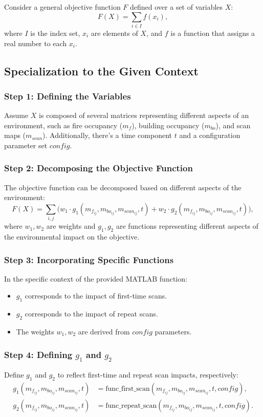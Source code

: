 \documentclass{article}
\begin{document}
Consider a general objective function $F$ defined over a set of variables $X$:
\[ F(X) = \sum_{i \in I} f(x_i), \]
where $I$ is the index set, $x_i$ are elements of $X$, and $f$ is a function that assigns a real number to each $x_i$.

\subsection*{Specialization to the Given Context}

\subsubsection*{Step 1: Defining the Variables}
Assume $X$ is composed of several matrices representing different aspects of an environment, such as fire occupancy ($m_f$), building occupancy ($m_{bo}$), and scan maps ($m_{scan}$). Additionally, there's a time component $t$ and a configuration parameter set $config$.

\subsubsection*{Step 2: Decomposing the Objective Function}
The objective function can be decomposed based on different aspects of the environment:
\[ F(X) = \sum_{i,j} \Big( w_1 \cdot g_1(m_{f_{ij}}, m_{bo_{ij}}, m_{scan_{ij}}, t) + w_2 \cdot g_2(m_{f_{ij}}, m_{bo_{ij}}, m_{scan_{ij}}, t) \Big), \]
where $w_1, w_2$ are weights and $g_1, g_2$ are functions representing different aspects of the environmental impact on the objective.

\subsubsection*{Step 3: Incorporating Specific Functions}
In the specific context of the provided MATLAB function:
\begin{itemize}
    \item $g_1$ corresponds to the impact of first-time scans.
    \item $g_2$ corresponds to the impact of repeat scans.
    \item The weights $w_1, w_2$ are derived from $config$ parameters.
\end{itemize}

\subsubsection*{Step 4: Defining $g_1$ and $g_2$}
Define $g_1$ and $g_2$ to reflect first-time and repeat scan impacts, respectively:
\begin{align*}
g_1(m_{f_{ij}}, m_{bo_{ij}}, m_{scan_{ij}}, t) &= \text{func\_first\_scan}(m_{f_{ij}}, m_{bo_{ij}}, m_{scan_{ij}}, t, config), \\
g_2(m_{f_{ij}}, m_{bo_{ij}}, m_{scan_{ij}}, t) &= \text{func\_repeat\_scan}(m_{f_{ij}}, m_{bo_{ij}}, m_{scan_{ij}}, t, config).
\end{align*}
\end{document}
